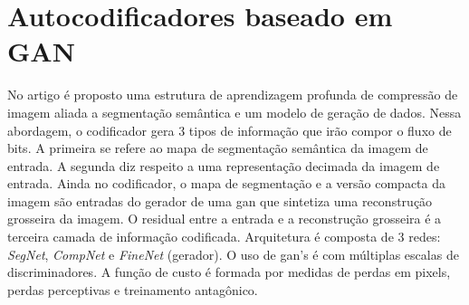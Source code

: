 













\section{Autocodificadores baseado em GAN}


No artigo \cite{akbari2019dsslic} é proposto uma estrutura de aprendizagem profunda de compressão de imagem aliada a segmentação semântica e um modelo de geração de dados. 
Nessa abordagem, o codificador gera 3 tipos de informação que irão compor o fluxo de bits. A primeira se refere ao mapa de segmentação semântica da imagem de entrada. A segunda diz respeito a uma representação decimada da imagem de entrada. Ainda no codificador, o mapa de segmentação e a versão compacta da imagem são entradas do gerador de uma \acrshort{gan} que sintetiza uma reconstrução grosseira da imagem. O residual entre a entrada e a reconstrução grosseira é a terceira camada de informação codificada. Arquitetura é composta de 3 redes: \textit{SegNet}, \textit{CompNet} e \textit{FineNet} (gerador). O uso de \acrshort{gan}'s é com múltiplas escalas de discriminadores. 
A função de custo é formada por medidas de perdas em pixels, perdas perceptivas e treinamento antagônico.

